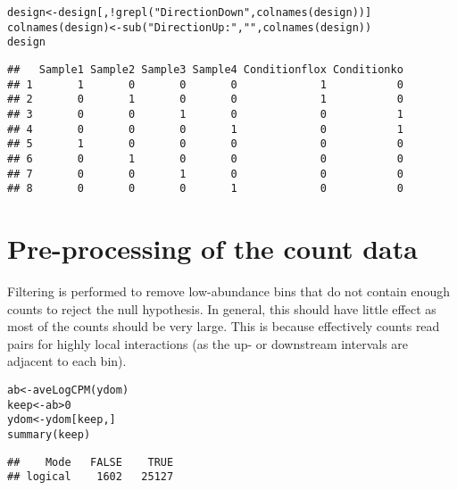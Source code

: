 \documentclass{report}\usepackage[]{graphicx}\usepackage[usenames,dvipsnames]{color}
\newcommand{\hlnum}[1]{\textcolor[rgb]{0.816,0.125,0.439}{#1}}%
\newcommand{\hlstr}[1]{\textcolor[rgb]{0.251,0.627,0.251}{#1}}%
\newcommand{\hlopt}[1]{\textcolor[rgb]{0,0,0}{#1}}%
\newcommand{\hlstd}[1]{\textcolor[rgb]{0.251,0.251,0.251}{#1}}%
\newcommand{\hlkwb}[1]{\textcolor[rgb]{0,0,0}{#1}}%
\newcommand{\hlkwd}[1]{\textcolor[rgb]{0.878,0.439,0.125}{#1}}%
\newenvironment{knitrout}{}{} %
\begin{document}
\begin{knitrout}
\color{fgcolor}\begin{kframe}
\begin{alltt}
\hlstd{design} \hlkwb{<-} \hlstd{design[,}\hlopt{!}\hlkwd{grepl}\hlstd{(}\hlstr{"DirectionDown"}\hlstd{,} \hlkwd{colnames}\hlstd{(design))]}
\hlkwd{colnames}\hlstd{(design)} \hlkwb{<-} \hlkwd{sub}\hlstd{(}\hlstr{"DirectionUp:"}\hlstd{,} \hlstr{""}\hlstd{,} \hlkwd{colnames}\hlstd{(design))}
\hlstd{design}
\end{alltt}
\begin{verbatim}
##   Sample1 Sample2 Sample3 Sample4 Conditionflox Conditionko
## 1       1       0       0       0             1           0
## 2       0       1       0       0             1           0
## 3       0       0       1       0             0           1
## 4       0       0       0       1             0           1
## 5       1       0       0       0             0           0
## 6       0       1       0       0             0           0
## 7       0       0       1       0             0           0
## 8       0       0       0       1             0           0
\end{verbatim}
\end{kframe}
\end{knitrout}

\section{Pre-processing of the count data}
Filtering is performed to remove low-abundance bins that do not contain enough counts to reject the null hypothesis.
In general, this should have little effect as most of the counts should be very large.
This is because  effectively counts read pairs for highly local interactions (as the up- or downstream intervals are adjacent to each bin).

\begin{knitrout}
\color{fgcolor}\begin{kframe}
\begin{alltt}
\hlstd{ab} \hlkwb{<-} \hlkwd{aveLogCPM}\hlstd{(ydom)}
\hlstd{keep} \hlkwb{<-} \hlstd{ab} \hlopt{>} \hlnum{0}
\hlstd{ydom} \hlkwb{<-} \hlstd{ydom[keep,]}
\hlkwd{summary}\hlstd{(keep)}
\end{alltt}
\begin{verbatim}
##    Mode   FALSE    TRUE 
## logical    1602   25127
\end{verbatim}
\end{kframe}
\end{knitrout}
\end{document}
